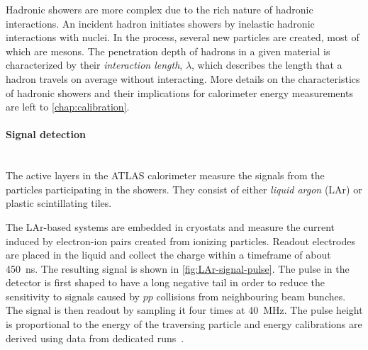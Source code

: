 Hadronic showers are more complex due to the rich nature of hadronic interactions. An incident hadron initiates showers by inelastic hadronic interactions with nuclei. In the process, several new particles are created, most of which are mesons.
The penetration depth of hadrons in a given material is characterized by their \emph{interaction length}, $\lambda$, which describes the length that a hadron travels on average without interacting.
More details on the characteristics of hadronic showers and their implications for calorimeter energy measurements are left to \cref{chap:calibration}.

\paragraph{Signal detection}\mbox{}\\
The active layers in the ATLAS calorimeter measure the signals from the particles participating in the showers. They consist of either \emph{liquid argon} (LAr) or plastic scintillating tiles.

The LAr-based systems are embedded in cryostats and measure the current induced by electron-ion pairs created from ionizing particles. Readout electrodes are placed in the liquid and collect the charge within a timeframe of about \SI{450}{\nano\second}. The resulting signal is shown in \cref{fig:LAr-signal-pulse}. The pulse in the detector is first shaped to have a long negative tail in order to reduce the sensitivity to signals caused by $pp$ collisions from neighbouring beam bunches. The signal is then readout by sampling it four times at \SI{40}{\mega\hertz}. The pulse height is proportional to the energy of the traversing particle and energy calibrations are derived using data from dedicated runs~\cite{Abreu:1303004}.

